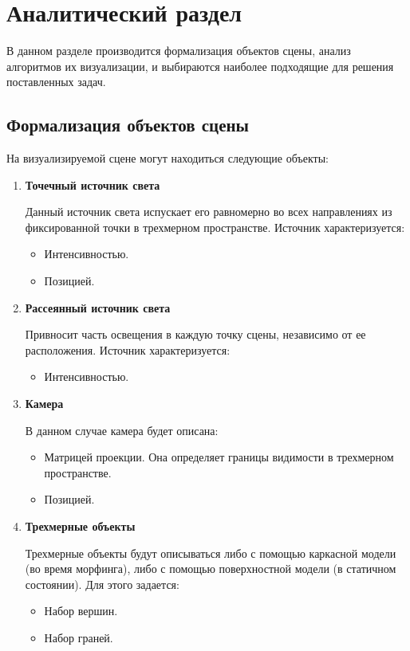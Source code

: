 \chapter{Аналитический раздел}

В данном разделе производится формализация объектов сцены, анализ алгоритмов их визуализации, и выбираются наиболее подходящие для решения поставленных задач.

\section[Формализация объектов синтезируемой сцены]{Формализация объектов сцены}
\label{sec:obj_formalasation}

На визуализируемой сцене могут находиться следующие объекты:
\begin{enumerate}
	\item \textbf{Точечный источник света}
	
	Данный источник света испускает его равномерно во всех направлениях из фиксированной точки в трехмерном пространстве.
	Источник характеризуется:
	\begin{itemize}
		\item Интенсивностью.
		\item Позицией.
	\end{itemize}
	
	\item \textbf{Рассеянный источник света}
	
	Привносит часть освещения в каждую точку сцены, независимо от ее расположения. 
	Источник характеризуется:
	\begin{itemize}
		\item Интенсивностью.
	\end{itemize}
	
	\item \textbf{Камера}
	
	В данном случае камера будет описана:
	\begin{itemize}
		\item Матрицей проекции. Она определяет границы видимости в трехмерном пространстве.
		\item Позицией.
	\end{itemize}
	
	\item \textbf{Трехмерные объекты}
		
	Трехмерные объекты будут описываться либо с помощью каркасной модели (во время морфинга), либо с помощью поверхностной модели (в статичном состоянии).
	Для этого задается:
	\begin{itemize}
		\item Набор вершин.
		\item Набор граней.
	\end{itemize}
\end{enumerate}


